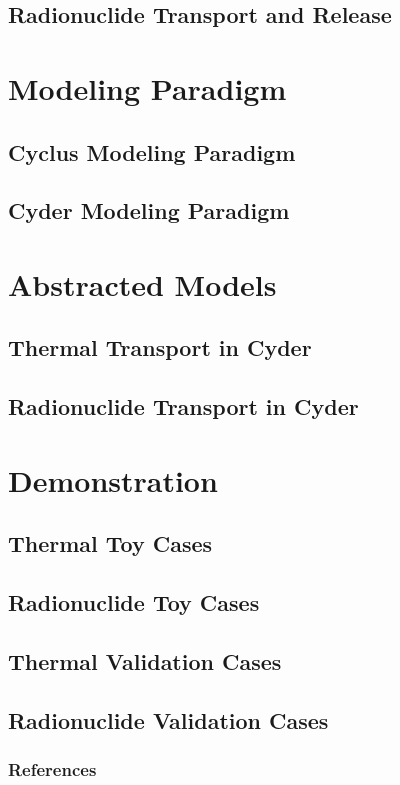 \documentclass[9pt]{beamer}
\begin{document}
\subsection{Radionuclide Transport and Release}


\section{Modeling Paradigm}
\subsection{Cyclus Modeling Paradigm}
\subsection{Cyder Modeling Paradigm}


\section{Abstracted Models}
\subsection{Thermal Transport in Cyder}

\subsection{Radionuclide Transport in Cyder}


\section{Demonstration}

\subsection{Thermal Toy Cases}
\subsection{Radionuclide Toy Cases}
\subsection{Thermal Validation Cases}
\subsection{Radionuclide Validation Cases}


\begin{frame}[allowframebreaks]
  \frametitle{References}
  
  {\footnotesize  }

\end{frame}

\end{document}
